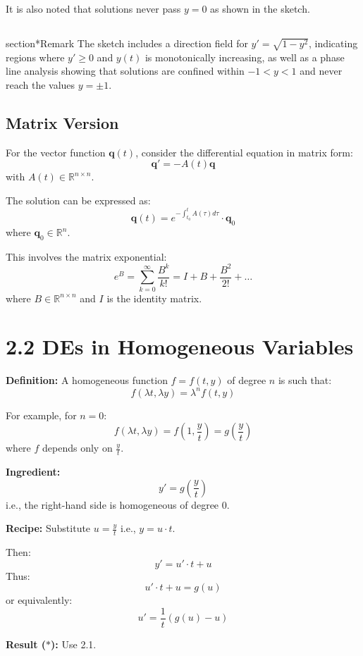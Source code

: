 \documentclass[11pt]{article}
\begin{document}
It is also noted that solutions never pass \( y = 0 \) as shown in the sketch.

\subsection{}section*{Remark}
The sketch includes a direction field for \( y' = \sqrt{1 - y^2} \), indicating regions where \( y' \geq 0 \) and \( y(t) \) is monotonically increasing, as well as a phase line analysis showing that solutions are confined within \( -1 < y < 1 \) and never reach the values \( y = \pm 1 \).


\subsection*{Matrix Version}

For the vector function \(\mathbf{q}(t)\), consider the differential equation in matrix form:
\[ \mathbf{q}' = -A(t) \mathbf{q} \]
with \( A(t) \in \mathbb{R}^{n \times n} \).

The solution can be expressed as:
\[ \mathbf{q}(t) = e^{-\int_{t_0}^{t} A(\tau) d\tau} \cdot \mathbf{q}_0 \]
where \( \mathbf{q}_0 \in \mathbb{R}^n \).

This involves the matrix exponential:
\[ e^B = \sum_{k=0}^{\infty} \frac{B^k}{k!} = I + B + \frac{B^2}{2!} + \ldots \]
where \( B \in \mathbb{R}^{n \times n} \) and \( I \) is the identity matrix.


\section*{2.2 DEs in Homogeneous Variables}

\textbf{Definition:} A homogeneous function \( f = f(t,y) \) of degree \( n \) is such that:
\[ f(\lambda t, \lambda y) = \lambda^n f(t,y) \]

For example, for \( n = 0 \):
\[ f(\lambda t, \lambda y) = f(1, \frac{y}{t}) = g(\frac{y}{t}) \]
where \( f \) depends only on \( \frac{y}{t} \).

\textbf{Ingredient:}
\[ y' = g\left(\frac{y}{t}\right) \]
i.e., the right-hand side is homogeneous of degree 0.

\textbf{Recipe:}
Substitute \( u = \frac{y}{t} \) i.e., \( y = u \cdot t \).

Then:
\[ y' = u' \cdot t + u \]
Thus:
\[ u' \cdot t + u = g(u) \]
or equivalently:
\[ u' = \frac{1}{t} (g(u) - u) \tag{*} \]

\textbf{Result (\(*\)):} Use 2.1.
\end{document}
